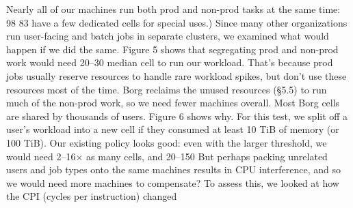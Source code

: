 Nearly all of our machines run both prod and non-prod tasks
at the same time: 98%
83%
have a few dedicated cells for special uses.)
Since many other organizations run user-facing and batch
jobs in separate clusters, we examined what would happen if
we did the same. Figure 5 shows that segregating prod and
non-prod work would need 20–30%
median cell to run our workload. That’s because prod jobs
usually reserve resources to handle rare workload spikes, but
don’t use these resources most of the time. Borg reclaims the
unused resources (§5.5) to run much of the non-prod work,
so we need fewer machines overall.
Most Borg cells are shared by thousands of users. Figure
6 shows why. For this test, we split off a user’s workload
into a new cell if they consumed at least 10 TiB of memory (or 100 TiB). Our existing policy looks good: even with
the larger threshold, we would need 2–16× as many cells,
and 20–150%
But perhaps packing unrelated users and job types onto
the same machines results in CPU interference, and so we
would need more machines to compensate? To assess this,
we looked at how the CPI (cycles per instruction) changed

